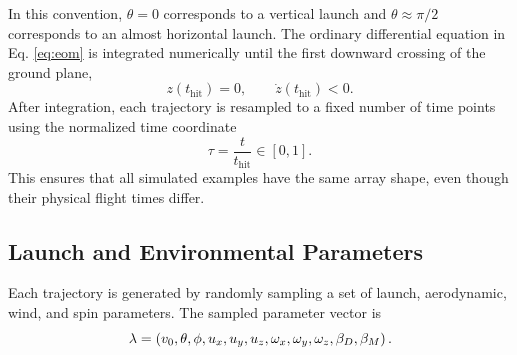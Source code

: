 In this convention, $\theta=0$ corresponds to a vertical launch and $\theta \approx \pi/2$ corresponds to an almost horizontal launch.
The ordinary differential equation in Eq. \eqref{eq:eom} is integrated numerically until the first downward crossing of the ground plane,
\begin{equation*}
    z(t_{\mathrm{hit}}) = 0, \qquad \dot{z}(t_{\mathrm{hit}}) < 0.
\end{equation*}
After integration, each trajectory is resampled to a fixed number of time points using the normalized time coordinate
\begin{equation*}
    \tau = \frac{t}{t_{\mathrm{hit}}} \in [0,1].
\end{equation*}
This ensures that all simulated examples have the same array shape, even though their physical flight times differ.

\subsection{Launch and Environmental Parameters}

Each trajectory is generated by randomly sampling a set of launch, aerodynamic, wind, and spin parameters.
The sampled parameter vector is
\begin{equation*}
    \vb{\lambda} = \left(
        v_0,
        \theta,
        \phi,
        u_x,
        u_y,
        u_z,
        \omega_x,
        \omega_y,
        \omega_z,
        \beta_D,
        \beta_M
    \right).
\end{equation*}

